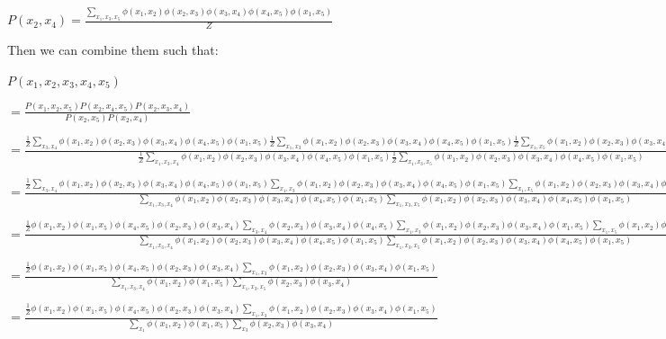 \documentclass[12pt]{article}
\begin{document}
$P(x_2, x_4) = \frac{\sum_{x_1, x_3, x_5} \phi(x_1, x_2)\phi(x_2, x_3)\phi(x_3, x_4)\phi(x_4, x_5)\phi(x_1, x_5)}{Z}$

Then we can combine them such that:

$P(x_1, x_2, x_3, x_4, x_5)$

$= \frac{P(x_1, x_2, x_5)P(x_2, x_4, x_5)P(x_2, x_3, x_4)}{P(x_2, x_5)P(x_2, x_4)}$

\tiny$= \frac{\frac{1}{Z}\sum_{x_3, x_4} \phi(x_1, x_2)\phi(x_2, x_3)\phi(x_3, x_4)\phi(x_4, x_5)\phi(x_1, x_5)\frac{1}{Z}\sum_{x_1, x_3} \phi(x_1, x_2)\phi(x_2, x_3)\phi(x_3, x_4)\phi(x_4, x_5)\phi(x_1, x_5)\frac{1}{Z}\sum_{x_1, x_5} \phi(x_1, x_2)\phi(x_2, x_3)\phi(x_3, x_4)\phi(x_4, x_5)\phi(x_1, x_5)}{\frac{1}{Z}\sum_{x_1, x_3, x_4} \phi(x_1, x_2)\phi(x_2, x_3)\phi(x_3, x_4)\phi(x_4, x_5)\phi(x_1, x_5)\frac{1}{Z}\sum_{x_1, x_3, x_5} \phi(x_1, x_2)\phi(x_2, x_3)\phi(x_3, x_4)\phi(x_4, x_5)\phi(x_1, x_5)}$

\tiny$= \frac{\frac{1}{Z}\sum_{x_3, x_4} \phi(x_1, x_2)\phi(x_2, x_3)\phi(x_3, x_4)\phi(x_4, x_5)\phi(x_1, x_5)\sum_{x_1, x_3} \phi(x_1, x_2)\phi(x_2, x_3)\phi(x_3, x_4)\phi(x_4, x_5)\phi(x_1, x_5)\sum_{x_1, x_5} \phi(x_1, x_2)\phi(x_2, x_3)\phi(x_3, x_4)\phi(x_4, x_5)\phi(x_1, x_5)}{\sum_{x_1, x_3, x_4} \phi(x_1, x_2)\phi(x_2, x_3)\phi(x_3, x_4)\phi(x_4, x_5)\phi(x_1, x_5)\sum_{x_1, x_3, x_5} \phi(x_1, x_2)\phi(x_2, x_3)\phi(x_3, x_4)\phi(x_4, x_5)\phi(x_1, x_5)}$

\tiny$= \frac{\frac{1}{Z}\phi(x_1, x_2)\phi(x_1, x_5)\phi(x_4, x_5)\phi(x_2, x_3)\phi(x_3, x_4)\sum_{x_3, x_4} \phi(x_2, x_3)\phi(x_3, x_4)\phi(x_4, x_5)\sum_{x_1, x_3} \phi(x_1, x_2)\phi(x_2, x_3)\phi(x_3, x_4)\phi(x_1, x_5)\sum_{x_1, x_5} \phi(x_1, x_2)\phi(x_4, x_5)\phi(x_1, x_5)}{\sum_{x_1, x_3, x_4} \phi(x_1, x_2)\phi(x_2, x_3)\phi(x_3, x_4)\phi(x_4, x_5)\phi(x_1, x_5)\sum_{x_1, x_3, x_5} \phi(x_1, x_2)\phi(x_2, x_3)\phi(x_3, x_4)\phi(x_4, x_5)\phi(x_1, x_5)}$

\small$= \frac{\frac{1}{Z}\phi(x_1, x_2)\phi(x_1, x_5)\phi(x_4, x_5)\phi(x_2, x_3)\phi(x_3, x_4)\sum_{x_1, x_3} \phi(x_1, x_2)\phi(x_2, x_3)\phi(x_3, x_4)\phi(x_1, x_5)}{\sum_{x_1, x_3, x_4} \phi(x_1, x_2)\phi(x_1, x_5)\sum_{x_1, x_3, x_5} \phi(x_2, x_3)\phi(x_3, x_4)}$

$= \frac{\frac{1}{Z}\phi(x_1, x_2)\phi(x_1, x_5)\phi(x_4, x_5)\phi(x_2, x_3)\phi(x_3, x_4)\sum_{x_1, x_3} \phi(x_1, x_2)\phi(x_2, x_3)\phi(x_3, x_4)\phi(x_1, x_5)}{\sum_{x_1} \phi(x_1, x_2)\phi(x_1, x_5)\sum_{x_3} \phi(x_2, x_3)\phi(x_3, x_4)}$
\end{document}
